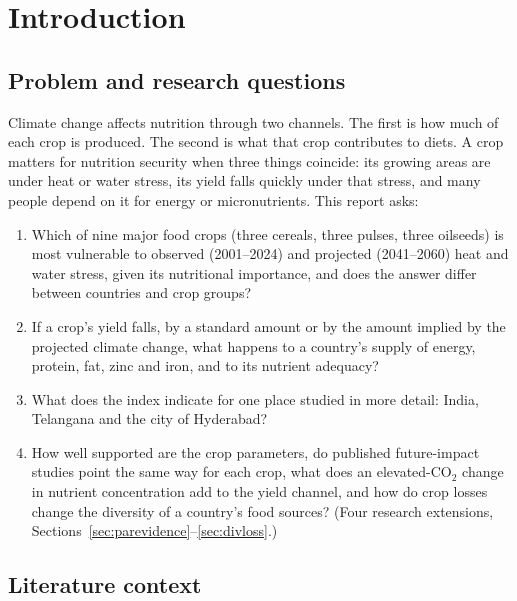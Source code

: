 \section{Introduction}\label{sec:intro}

\subsection{Problem and research questions}
Climate change affects nutrition through two channels. The first is how much of each crop is produced. The
second is what that crop contributes to diets. A crop matters for nutrition security when three things
coincide: its growing areas are under heat or water stress, its yield falls quickly under that stress, and many
people depend on it for energy or micronutrients. This report asks:
\begin{enumerate}[label=\textbf{RQ\arabic*}]
\item Which of nine major food crops (three cereals, three pulses, three oilseeds) is most vulnerable to
observed (2001--2024) and projected (2041--2060) heat and water stress, given its nutritional importance, and
does the answer differ between countries and crop groups?
\item If a crop's yield falls, by a standard amount or by the amount implied by the projected climate change,
what happens to a country's supply of energy, protein, fat, zinc and iron, and to its nutrient adequacy?
\item What does the index indicate for one place studied in more detail: India, Telangana and the city of
Hyderabad?
\item How well supported are the crop parameters, do published future-impact studies point the same way for each
crop, what does an elevated-CO$_2$ change in nutrient concentration add to the yield channel, and how do crop losses
change the diversity of a country's food sources? (Four research extensions, Sections~\ref{sec:parevidence}--\ref{sec:divloss}.)
\end{enumerate}

\subsection{Literature context}
